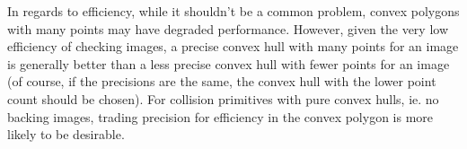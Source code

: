 In regards to efficiency, while it shouldn't be a common problem, convex polygons with many
points may have degraded performance. However, given the very low efficiency of checking images,
a precise convex hull with many points for an image is generally better than a less precise convex hull
with fewer points for an image (of course, if the precisions are the same, the convex hull with the lower
point count should be chosen). For collision primitives with pure convex hulls, ie. no backing images,
trading precision for efficiency in the convex polygon is more likely to be desirable.

